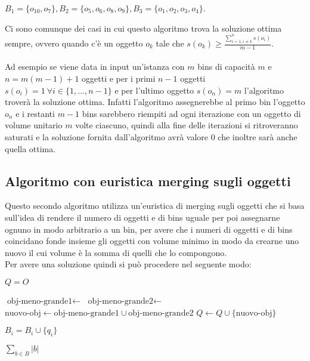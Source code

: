 \begin{center}
	$ B_1 = \{o_{10}, o_7\}, B_2 = \{o_5, o_6, o_8, o_9\}, B_3 = \{o_1, o_2, o_3, o_4\} $.
\end{center}

\noindent
Ci sono comunque dei casi in cui questo algoritmo trova la soluzione ottima sempre, ovvero quando c'è un oggetto $ o_k $ tale che 
$ s(o_k) \geq \displaystyle\frac{\sum_{i=1, i \neq k}^n s(o_i)}{m - 1} $. \\ \\ 
Ad esempio se viene data in input un'istanza con $ m $ bins di capacità $ m $ e $ n = m(m - 1) + 1 $ oggetti e per i primi $ n - 1 $ oggetti 
$ s(o_i) = 1 \: \forall i \in \{1, ..., n - 1\} $ e per l'ultimo oggetto $ s(o_n) = m $ l'algoritmo troverà la soluzione ottima.
Infatti l'algoritmo assegnerebbe al primo bin l'oggetto $ o_n $ e i restanti $ m - 1 $ bins sarebbero riempiti ad ogni iterazione 
con un oggetto di volume unitario $ m $ volte ciascuno, quindi alla fine delle iterazioni si ritroveranno saturati e la soluzione 
fornita dall'algoritmo avrà valore $ 0 $ che inoltre sarà anche quella ottima.

\subsection{Algoritmo con euristica merging sugli oggetti}
Questo secondo algoritmo utilizza un'euristica di merging sugli oggetti che si basa sull'idea di rendere il numero di oggetti e di
bins uguale per poi assegnarne ognuno in modo arbitrario a un bin, per avere che i numeri di oggetti e di bins coincidano fonde insieme gli oggetti
con volume minimo in modo da crearne uno nuovo il cui volume è la somma di quelli che lo compongono.\\
Per avere una soluzione quindi si può procedere nel seguente modo:
\begin{algorithm}[H]
\begin{algorithmic}[1]

    \State $ Q = O $

        \State $ \text{obj-meno-grande1} \leftarrow $ 
        \State $ \text{obj-meno-grande2} \leftarrow $ 
        \State $ \text{nuovo-obj} \leftarrow \text{obj-meno-grande1} \cup \text{obj-meno-grande2} $
        \State $ Q \leftarrow Q \cup \{\text{nuovo-obj}\} $
    \EndWhile
    
    	\State $ B_i = B_i \cup \{q_i\} $
    \EndFor
    
    \State \Return $ \displaystyle\sum\limits_{b \in B} |b| $
\EndFunction

\end{algorithmic}
\end{algorithm}

